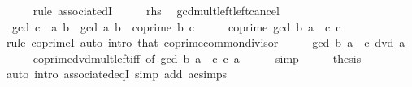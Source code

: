 \begin{isabellebody}
\ \ \ \ \isamarkupfalse%
\ {\isacharparenleft}{\kern0pt}rule\ associatedI{\isacharparenright}{\kern0pt}\isanewline
\ \ \isamarkupfalse%
\ \isamarkupfalse%
\ {\isacharquery}{\kern0pt}rhs\ \isacommand{{\isachardot}{\kern0pt}{\isachardot}{\kern0pt}}\isamarkupfalse%
\isanewline
{}\isamarkupfalse%
%
\endisatagproof
{\isafoldproof}%
%
\isadelimproof
\isanewline
%
\endisadelimproof
\isanewline
{}\isamarkupfalse%
\ gcd{\isacharunderscore}{\kern0pt}mult{\isacharunderscore}{\kern0pt}left{\isacharunderscore}{\kern0pt}left{\isacharunderscore}{\kern0pt}cancel{\isacharcolon}{\kern0pt}\isanewline
\ \ {\isachardoublequoteopen}gcd\ {\isacharparenleft}{\kern0pt}c\ {\isacharasterisk}{\kern0pt}\ a{\isacharparenright}{\kern0pt}\ b\ {\isacharequal}{\kern0pt}\ gcd\ a\ b{\isachardoublequoteclose}\ \ {\isachardoublequoteopen}coprime\ b\ c{\isachardoublequoteclose}\isanewline
%
\isadelimproof
%
\endisadelimproof
%
\isatagproof
{}\isamarkupfalse%
\ {\isacharminus}{\kern0pt}\isanewline
\ \ \isamarkupfalse%
\ {\isachardoublequoteopen}coprime\ {\isacharparenleft}{\kern0pt}gcd\ b\ {\isacharparenleft}{\kern0pt}a\ {\isacharasterisk}{\kern0pt}\ c{\isacharparenright}{\kern0pt}{\isacharparenright}{\kern0pt}\ c{\isachardoublequoteclose}\isanewline
\ \ \ \ \isamarkupfalse%
\ {\isacharparenleft}{\kern0pt}rule\ coprimeI{\isacharparenright}{\kern0pt}\ {\isacharparenleft}{\kern0pt}auto\ intro{\isacharcolon}{\kern0pt}\ that\ coprime{\isacharunderscore}{\kern0pt}common{\isacharunderscore}{\kern0pt}divisor{\isacharparenright}{\kern0pt}\isanewline
\ \ \isamarkupfalse%
\ \isamarkupfalse%
\ {\isachardoublequoteopen}gcd\ b\ {\isacharparenleft}{\kern0pt}a\ {\isacharasterisk}{\kern0pt}\ c{\isacharparenright}{\kern0pt}\ dvd\ a{\isachardoublequoteclose}\isanewline
\ \ \ \ \isamarkupfalse%
\ coprime{\isacharunderscore}{\kern0pt}dvd{\isacharunderscore}{\kern0pt}mult{\isacharunderscore}{\kern0pt}left{\isacharunderscore}{\kern0pt}iff\ {\isacharbrackleft}{\kern0pt}of\ {\isachardoublequoteopen}gcd\ b\ {\isacharparenleft}{\kern0pt}a\ {\isacharasterisk}{\kern0pt}\ c{\isacharparenright}{\kern0pt}{\isachardoublequoteclose}\ c\ a{\isacharbrackright}{\kern0pt}\isanewline
\ \ \ \ \isamarkupfalse%
\ simp\isanewline
\ \ \isamarkupfalse%
\ \isamarkupfalse%
\ {\isacharquery}{\kern0pt}thesis\isanewline
\ \ \ \ \isamarkupfalse%
\ {\isacharparenleft}{\kern0pt}auto\ intro{\isacharcolon}{\kern0pt}\ associated{\isacharunderscore}{\kern0pt}eqI\ simp\ add{\isacharcolon}{\kern0pt}\ ac{\isacharunderscore}{\kern0pt}simps{\isacharparenright}{\kern0pt}\isanewline

\end{isabellebody}
